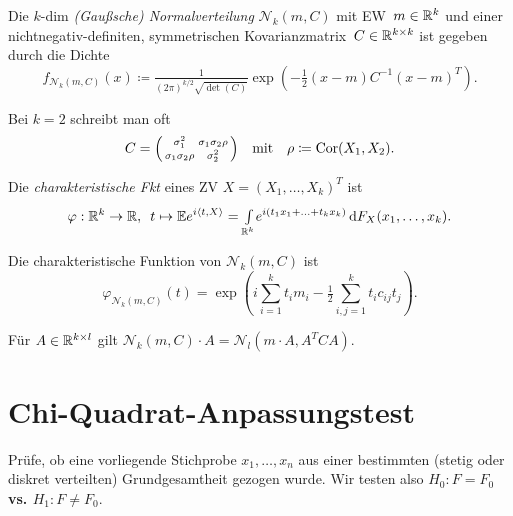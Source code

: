 \documentclass{cheat-sheet}
\newcommand{\E}{\mathbb{E}} %
\newcommand{\scp}[2]{\langle #1, #2 \rangle} %
\DeclareMathOperator{\cor}{Cor} %
\newcommand{\testh}[1]{\textcolor{TestColor}{\textbf{#1}}}
\newcommand{\Normal}{\mathcal{N}} %
\begin{document}

\begin{defn}
  Die $k$-dim \emph{(Gaußsche) Normalverteilung} $\Normal_k(m, C)$ mit EW~$m \in \mathbb{R}^k$ und einer nichtnegativ-definiten, symmetrischen Kovarianzmatrix~$C \in \mathbb{R}^{k \times k}$ ist gegeben durch die Dichte
  \[ f_{\Normal_k(m, C)}(x) \coloneqq \tfrac{1}{(2\pi)^{k/2} \sqrt{\det(C)}} \exp \left( - \tfrac{1}{2} (x-m) C^{-1} (x-m)^T \right). \]
\end{defn}

\begin{bem}
  Bei $k=2$ schreibt man oft
  \[
    C = \begin{psmallmatrix}
      \sigma_1^2 & \sigma_1 \sigma_2 \rho \\
      \sigma_1 \sigma_2 \rho & \sigma_2^2
    \end{psmallmatrix}
    \quad \text{mit} \quad
    \rho \coloneqq \cor(X_1, X_2).
  \]
\end{bem}

\begin{defn}
  Die \emph{charakteristische Fkt} eines ZV $X = (X_1, \ldots, X_k)^T$ ist
  \[
    \varphi : \R^k \to \R, \enspace
    t \mapsto \E e^{i \scp{t}{X}} = \Int{\R^k}{}{e^{i (t_1 x_1 + \ldots + t_k x_k)}}{F_X(x_1, \ldots, x_k)}.
  \]
\end{defn}

\begin{bem}
  Die charakteristische Funktion von $\Normal_k(m, C)$ ist
  \[ \varphi_{\Normal_k(m, C)}(t) = \exp \left( i \sum_{i=1}^k t_i m_i - \tfrac{1}{2} \sum_{i,j=1}^k t_i c_{ij} t_j \right). \]
\end{bem}

\begin{satz}
  Für $A \in \mathbb{R}^{k \times l}$ gilt $\Normal_k(m, C) \cdot A = \Normal_l(m \cdot A, A^T C A)$.
\end{satz}


\section{Chi-Quadrat-Anpassungstest}


\begin{aufgabe}
  Prüfe, ob eine vorliegende Stichprobe $x_1, \ldots, x_n$ aus einer bestimmten (stetig oder diskret verteilten) Grundgesamtheit gezogen wurde. Wir testen also \testh{$H_0 : F = F_0$ vs. $H_1 : F \neq F_0$}.
\end{aufgabe}
\end{document}
